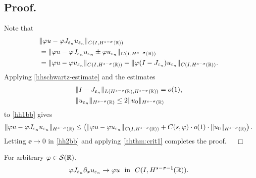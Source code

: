 \subsection{Proof.} Note that
\begin{equation}
\begin{split}
& \|\varphi u - \varphi J_{\varepsilon_n} u_{\varepsilon_n}
\|_{C(I, H^{s-\sigma}(\mathbb{R}))}
\\
&= \|\varphi u - \varphi J_{\varepsilon_n} u_{\varepsilon_n} \pm \varphi
u_{\varepsilon_n} \|_{C(I, H^{s-\sigma}(\mathbb{R}))}
\\
& = \|\varphi u - \varphi u_{\varepsilon_n}
\|_{C(I, H^{s-\sigma}(\mathbb{R}))} + \|\varphi (I - J_{\varepsilon_n})
u_{\varepsilon_n} \|_{C(I, H^{s-\sigma}(\mathbb{R}))}.
\label{hh1bb}
\end{split}
\end{equation}
Applying \eqref{hhschwartz-estimate} and the estimates
\begin{equation*}
\begin{split}
& \|I-J_{\varepsilon_n} \|_{L(H^{s-\sigma}(\mathbb{R}), H^{s -
\sigma}(\mathbb{R}))} = o(1),
\\
& \|u_{\varepsilon_n}\|_{H^{s-\sigma}(\mathbb{R})} \le 2
\|u_0\|_{H^{s-\sigma}(\mathbb{R})}
\end{split}
\end{equation*}
to \eqref{hh1bb} gives
\begin{equation}
\label{hh2bb}
\begin{split}
\|\varphi u - \varphi J_{\varepsilon_n} u_{\varepsilon_n}\|_{H^{s-\sigma}(\mathbb{R})}
\le \left( \|\varphi u - \varphi u_{\varepsilon_n}
\|_{C(I, H^{s-\sigma}(\mathbb{R}))} + C(s, \varphi) \cdot o(1) \cdot \|u_0
\|_{H^{s-\sigma}(\mathbb{R})} \right).
\end{split}
\end{equation}
Letting $\ee \to 0$ in \eqref{hh2bb} and applying \cref{hhthm:crit1} completes the proof. $\quad \Box$
%
%
\begin{proposition}
\label{hhprop:dd}
For arbitrary $ \varphi \in \mathcal{S}(\mathbb{R})$,
\begin{equation}
\begin{split}
\varphi J_{\varepsilon_n} \partial_x u_{\varepsilon_n} \to \varphi u \ \
\text{in} \ \ C(I, H^{s-\sigma-1}(\mathbb{R})).
\label{hh0dd}
\end{split}
\end{equation}
\end{proposition}
